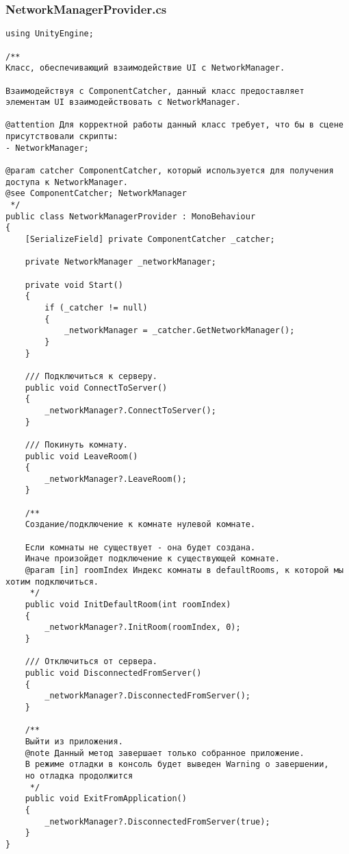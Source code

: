 \subsubsection*{NetworkManagerProvider.cs}
\begin{verbatim}
﻿using UnityEngine;

/**
Класс, обеспечивающий взаимодействие UI с NetworkManager.

Взаимодействуя с ComponentCatcher, данный класс предоставляет элементам UI взаимодействовать с NetworkManager.

@attention Для корректной работы данный класс требует, что бы в сцене присутствовали скрипты:
- NetworkManager;

@param catcher ComponentCatcher, который используется для получения доступа к NetworkManager.
@see ComponentCatcher; NetworkManager
 */
public class NetworkManagerProvider : MonoBehaviour
{
    [SerializeField] private ComponentCatcher _catcher;

    private NetworkManager _networkManager;

    private void Start()
    {
        if (_catcher != null)
        {
            _networkManager = _catcher.GetNetworkManager();
        }
    }

    /// Подключиться к серверу.
    public void ConnectToServer()
    {
        _networkManager?.ConnectToServer();
    }

    /// Покинуть комнату.
    public void LeaveRoom()
    {
        _networkManager?.LeaveRoom();
    }

    /**
    Создание/подключение к комнате нулевой комнате.

    Если комнаты не существует - она будет создана. 
    Иначе произойдет подключение к существующей комнате.
    @param [in] roomIndex Индекс комнаты в defaultRooms, к которой мы хотим подключиться.
     */
    public void InitDefaultRoom(int roomIndex)
    {
        _networkManager?.InitRoom(roomIndex, 0);
    }

    /// Отключиться от сервера.
    public void DisconnectedFromServer()
    {
        _networkManager?.DisconnectedFromServer();
    }

    /**
    Выйти из приложения.
    @note Данный метод завершает только собранное приложение. 
    В режиме отладки в консоль будет выведен Warning о завершении, 
    но отладка продолжится
     */
    public void ExitFromApplication()
    {
        _networkManager?.DisconnectedFromServer(true);
    }
}

\end{verbatim}
